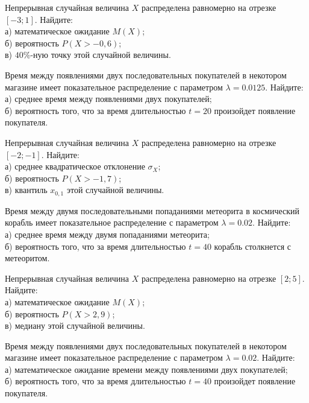 \vfill

\newpage\setcounter{zad}{0}

\z Непрерывная случайная величина $X$ распределена равномерно на отрезке $[-3; 1]$. Найдите: \\ \quad а) математическое ожидание $M(X)$; \\ \quad б) вероятность $P(X>-0{,}6)$; \\ \quad в) $40\%$-ную точку этой случайной величины.


\vfill

\z Время между появлениями двух последовательных покупателей в некотором магазине имеет показательное распределение с параметром $\lambda = 0.0125$. Найдите: \\ \quad а) среднее время между появлениями двух покупателей; \\ \quad б) вероятность того, что за время длительностью $t = 20$  произойдет появление покупателя.
 

\vfill

\newpage\setcounter{zad}{0}

\z Непрерывная случайная величина $X$ распределена равномерно на отрезке $[-2; -1]$. Найдите: \\ \quad а) среднее квадратическое отклонение $\sigma_X$; \\ \quad б) вероятность $P(X>-1{,}7)$; \\ \quad в) квантиль $x_{0{,}1}$ этой случайной величины.


\vfill

\z Время между двумя последовательными попаданиями метеорита в космический корабль имеет показательное распределение с параметром $\lambda = 0.02$. Найдите: \\ \quad а) среднее время между двумя попаданиями метеорита; \\ \quad б) вероятность того, что за время длительностью $t = 40$ корабль  столкнется с метеоритом.
 

\vfill

\newpage\setcounter{zad}{0}

\z Непрерывная случайная величина $X$ распределена равномерно на отрезке $[2; 5]$. Найдите: \\ \quad а) математическое ожидание $M(X)$; \\ \quad б) вероятность $P(X>2{,}9)$; \\ \quad в) медиану этой случайной величины.


\vfill

\z Время между появлениями двух последовательных покупателей в некотором магазине имеет показательное распределение с параметром $\lambda = 0.02$. Найдите: \\ \quad а) математическое ожидание времени между появлениями двух покупателей; \\ \quad б) вероятность того, что за время длительностью $t = 40$  произойдет появление покупателя.
 

